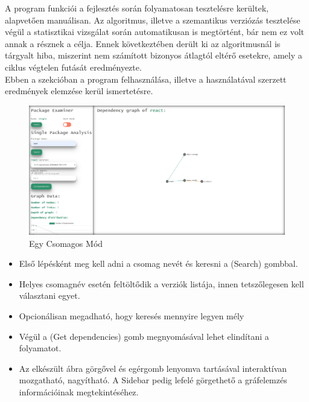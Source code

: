 
A program funkciói a fejlesztés során folyamatosan tesztelésre kerültek, alapvetően manuálisan. Az algoritmus, illetve a szemantikus verziózás tesztelése végül a statisztikai vizsgálat során automatikusan is megtörtént, bár nem ez volt annak a résznek a célja. Ennek következtében derült ki az algoritmusnál is tárgyalt hiba, miszerint nem számított bizonyos átlagtól eltérő esetekre, amely a ciklus végtelen futását eredményezte.\\

Ebben a szekcióban a program felhasználása, illetve a használatával szerzett eredmények elemzése kerül ismertetésre.


\begin{figure}[!h]
	\centering
	\includegraphics[scale=0.2]{images/examiner.png}
	\caption{Egy Csomagos Mód}
	\label{fig:examiner}
\end{figure}

\begin{itemize}
	\item Első lépésként meg kell adni a csomag nevét és keresni a (Search) gombbal.
	\item Helyes csomagnév esetén feltöltődik a verziók listája, innen tetszőlegesen kell választani egyet.
	\item Opcionálisan megadható, hogy keresés mennyire legyen mély
	\item Végül a (Get dependencies) gomb megnyomásával lehet elindítani a folyamatot.
	\item Az elkészült ábra görgővel és egérgomb lenyomva tartásával interaktívan mozgatható, nagyítható. A Sidebar pedig lefelé görgethető a gráfelemzés információinak megtekintéséhez.
\end{itemize}

\pagebreak

